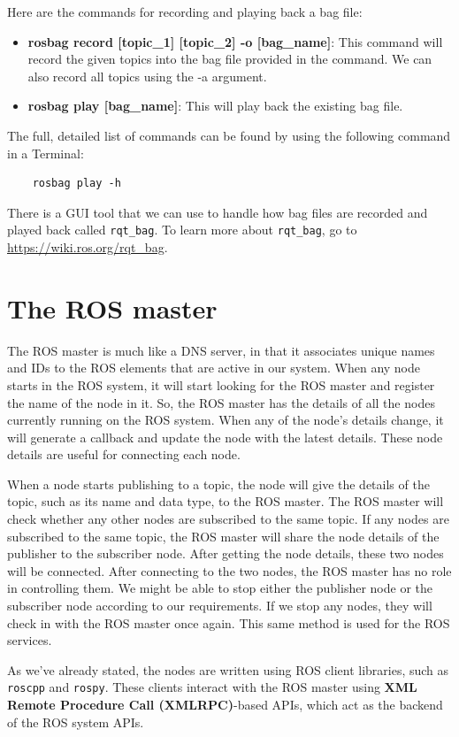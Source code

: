 \documentclass[../../main]{subfiles}
\begin{document}
Here are the commands for recording and playing back a bag file:
\begin{itemize}
    \item \textbf{rosbag record [topic\_1] [topic\_2] -o [bag\_name]}: This command will record the given topics into the bag file provided in the command. We can also record all topics using the -a argument.
    \item \textbf{rosbag play [bag\_name]}: This will play back the existing bag file.
\end{itemize}
The full, detailed list of commands can be found by using the following command in a
Terminal:
\begin{verbatim}
    rosbag play -h
\end{verbatim}
There is a GUI tool that we can use to handle how bag files are recorded and played back called \texttt{rqt\_bag}. To learn more about \texttt{rqt\_bag}, go to \url{https://wiki.ros.org/rqt_bag}.

\section{The ROS master}
The ROS master is much like a DNS server, in that it associates unique names and IDs to the ROS elements that are active in our system. When any node starts in the ROS system, it will start looking for the ROS master and register the name of the node in it. So, the ROS master has the details of all the nodes currently running on the ROS system. When any of the node's details change, it will generate a callback and update the node with the latest details. These node details are useful for connecting each node.

When a node starts publishing to a topic, the node will give the details of the topic, such as its name and data type, to the ROS master. The ROS master will check whether any other nodes are subscribed to the same topic. If any nodes are subscribed to the same topic, the ROS master will share the node details of the publisher to the subscriber node. After getting the node details, these two nodes will be connected. After connecting to the two nodes, the ROS master has no role in controlling them. We might be able to stop either the publisher node or the subscriber node according to our requirements. If we stop any nodes, they will check in with the ROS master once again. This same method is used for the ROS services.

As we've already stated, the nodes are written using ROS client libraries, such as \texttt{roscpp} and \texttt{rospy}. These clients interact with the ROS master using \textbf{XML Remote Procedure Call (XMLRPC)}-based APIs, which act as the backend of the ROS system APIs.
\end{document}
